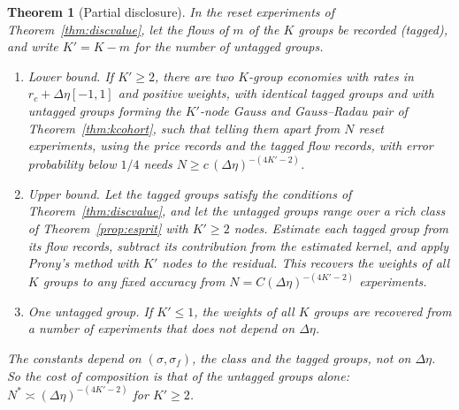 \documentclass[12pt]{article}
\newtheorem{theorem}{Theorem}[section]
\theoremstyle{definition}
\theoremstyle{remark}
\begin{document}
\begin{theorem}[Partial disclosure]\label{thm:partial}
In the reset experiments of Theorem~\ref{thm:discvalue}, let the flows of $m$ of the $K$ groups be recorded (tagged), and write $K'=K-m$ for the number of untagged groups.
\begin{enumerate}[label=(\roman*),itemsep=1pt]
\item \emph{Lower bound.} If $K'\ge2$, there are two $K$-group economies with rates in $r_c+\Delta\eta[-1,1]$ and positive weights, with identical tagged groups and with untagged groups forming the $K'$-node Gauss and Gauss--Radau pair of Theorem~\ref{thm:kcohort}, such that telling them apart from $N$ reset experiments, using the price records and the tagged flow records, with error probability below $1/4$ needs $N\ge c\,(\Delta\eta)^{-(4K'-2)}$.
\item \emph{Upper bound.} Let the tagged groups satisfy the conditions of Theorem~\ref{thm:discvalue}, and let the untagged groups range over a rich class of Theorem~\ref{prop:esprit} with $K'\ge2$ nodes. Estimate each tagged group from its flow records, subtract its contribution from the estimated kernel, and apply Prony's method with $K'$ nodes to the residual. This recovers the weights of all $K$ groups to any fixed accuracy from $N=C(\Delta\eta)^{-(4K'-2)}$ experiments.
\item \emph{One untagged group.} If $K'\le1$, the weights of all $K$ groups are recovered from a number of experiments that does not depend on $\Delta\eta$.
\end{enumerate}
The constants depend on $(\sigma,\sigma_f)$, the class and the tagged groups, not on $\Delta\eta$. So the cost of composition is that of the untagged groups alone: $N^*\asymp(\Delta\eta)^{-(4K'-2)}$ for $K'\ge2$.
\end{theorem}
\end{document}
